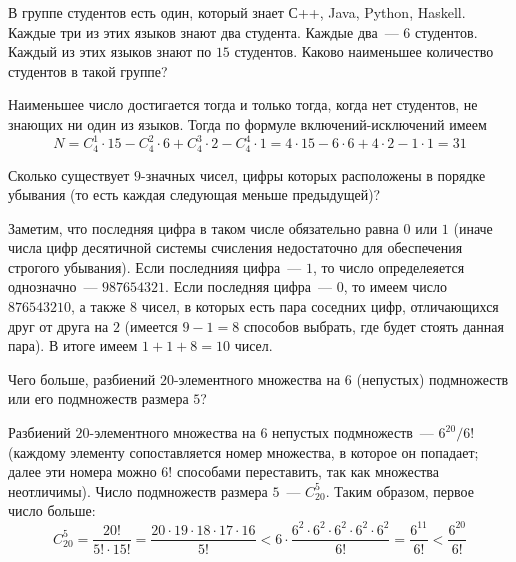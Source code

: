 \begin{Exercise}[counter=SecExercise]
    \noindent
    В группе студентов есть один, который знает С++, Java, Python, Haskell.
    Каждые три из этих языков знают два студента.
    Каждые два~--- $ 6 $ студентов.
    Каждый из этих языков знают по $ 15 $ студентов.
    Каково наименьшее количество студентов в такой группе?
\end{Exercise}

\begin{Answer}
    \noindent
    Наименьшее число достигается тогда и только тогда, когда нет студентов, не знающих ни один из языков.
    Тогда по формуле включений-исключений имеем
    \[
        N = C_4^1 \cdot 15 - C_4^2 \cdot 6 + C_4^3 \cdot 2 - C_4^4 \cdot 1 = 4 \cdot 15 - 6 \cdot 6 + 4 \cdot 2 - 1 \cdot 1 = 31
    \]
\end{Answer}


\begin{Exercise}[counter=SecExercise, label={exercise:combinatorics:monotonic_digits}]
    \noindent
    Сколько существует $ 9 $-значных чисел,
    цифры которых расположены в порядке убывания (то есть каждая следующая меньше предыдущей)?
\end{Exercise}

\begin{Answer}
    \noindent
    Заметим, что последняя цифра в таком числе обязательно равна $ 0 $ или $ 1 $
    (иначе числа цифр десятичной системы счисления недостаточно для обеспечения строгого убывания).
    Если последнияя цифра~--- $ 1 $,
    то число определеяется однозначно~--- $ 987654321 $.
    Если последняя цифра~--- $ 0 $,
    то имеем число $ 876543210 $,
    а также $ 8 $ чисел, в которых есть пара соседних цифр, отличающихся друг от друга на $ 2 $
    (имеется $ 9 - 1 = 8 $ способов выбрать, где будет стоять данная пара).
    В итоге имеем $ 1 + 1 + 8 = 10 $ чисел.
\end{Answer}


\begin{Exercise}[counter=SecExercise, label={exercise:combinatorics:subsets_decomposition}]
    \noindent
    Чего больше, разбиений $ 20 $-элементного множества на $ 6 $ (непустых) подмножеств или его подмножеств размера $ 5 $?
\end{Exercise}

\begin{Answer}
    \noindent
    Разбиений $ 20 $-элементного множества на $ 6 $ непустых подмножеств~--- $ 6^{20} / 6! $
    (каждому элементу сопоставляется номер множества, в которое он попадает;
    далее эти номера можно $ 6! $ способами переставить, так как множества неотличимы).
    Число подмножеств размера $ 5 $~--- $ C_{20}^5 $.
    Таким образом, первое число больше:
    \[
        C_{20}^5 = \frac{20!}{5! \cdot 15!} = \frac{20 \cdot 19 \cdot 18 \cdot 17 \cdot 16}{5!} < 6 \cdot \frac{6^2 \cdot 6^2 \cdot 6^2 \cdot 6^2 \cdot 6^2}{6!} = \frac{6^{11}}{6!} < \frac{6^{20}}{6!}
    \]
\end{Answer}


